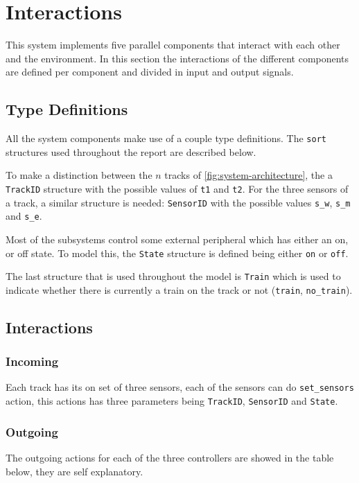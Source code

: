 \documentclass[final]{report}
\begin{document}
\chapter{Interactions}\label{ch:interactions}
This system implements five parallel components that interact with each other and the environment.
In this section the interactions of the different components are defined per component and divided in input and output signals.

\section{Type Definitions}\label{sec:interactions-typedef}
All the system components make use of a couple type definitions.
The \texttt{sort} structures used throughout the report are described below.

To make a distinction between the $n$ tracks of \cref{fig:system-architecture}, the a \texttt{TrackID} structure with the possible values of \texttt{t1} and \texttt{t2}.
For the three sensors of a track, a similar structure is needed: \texttt{SensorID} with the possible values \texttt{s\_w}, \texttt{s\_m} and \texttt{s\_e}.

Most of the subsystems control some external peripheral which has either an on, or off state.
To model this, the \texttt{State} structure is defined being either \texttt{on} or \texttt{off}.

The last structure that is used throughout the model is \texttt{Train} which is used to indicate whether there is currently a train on the track or not (\texttt{train}, \texttt{no_train}).

\section{Interactions}\label{sec:interactions-external}
\subsection{Incoming}
Each track has its on set of three sensors, each of the sensors can do \texttt{set\_sensors} action, this actions has three parameters being \texttt{TrackID}, \texttt{SensorID} and \texttt{State}.

\subsection{Outgoing}
The outgoing actions for each of the three controllers are showed in the table below, they are self explanatory.
\end{document}

